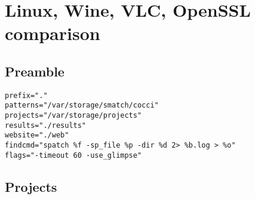 \chapter{Linux, Wine, VLC, OpenSSL comparison}
\label{sec:soft-comparison}

\section{Preamble}
\label{sec:ex-preamble}

\begin{lstlisting}
prefix="."
patterns="/var/storage/smatch/cocci"
projects="/var/storage/projects"
results="./results"
website="./web"
findcmd="spatch %f -sp_file %p -dir %d 2> %b.log > %o"
flags="-timeout 60 -use_glimpse"
\end{lstlisting}

\section{Projects}
\label{sec:ex-projects}

